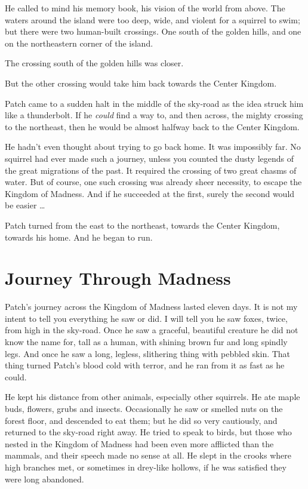 \documentclass[12pt]{book}
\begin{document}
He called to mind his memory book, his vision of the world from
above. The waters around the island were too deep, wide, and violent
for a squirrel to swim; but there were two human-built crossings. One
south of the golden hills, and one on the northeastern corner of the
island.

The crossing south of the golden hills was closer.

But the other crossing would take him back towards the Center Kingdom.

Patch came to a sudden halt in the middle of the sky-road as the idea
struck him like a thunderbolt. If he \textit{could} find a way to, and
then across, the mighty crossing to the northeast, then he would be
almost halfway back to the Center Kingdom.

He hadn't even thought about trying to go back home. It was impossibly
far. No squirrel had ever made such a journey, unless you counted the
dusty legends of the great migrations of the past. It required the
crossing of two great chasms of water. But of course, one such
crossing was already sheer necessity, to escape the Kingdom of
Madness. And if he succeeded at the first, surely the second would be
easier \ldots{}

Patch turned from the east to the northeast, towards the Center
Kingdom, towards his home. And he began to run.


\section{Journey Through Madness}

Patch's journey across the Kingdom of Madness lasted eleven days. It
is not my intent to tell you everything he saw or did. I will tell you
he saw foxes, twice, from high in the sky-road. Once he saw a
graceful, beautiful creature he did not know the name for, tall as a
human, with shining brown fur and long spindly legs. And once he saw a
long, legless, slithering thing with pebbled skin. That thing turned
Patch's blood cold with terror, and he ran from it as fast as he
could.

He kept his distance from other animals, especially other
squirrels. He ate maple buds, flowers, grubs and insects. Occasionally
he saw or smelled nuts on the forest floor, and descended to eat them;
but he did so very cautiously, and returned to the sky-road right
away. He tried to speak to birds, but those who nested in the Kingdom
of Madness had been even more afflicted than the mammals, and their
speech made no sense at all. He slept in the crooks where high
branches met, or sometimes in drey-like hollows, if he was satisfied
they were long abandoned.
\end{document}
